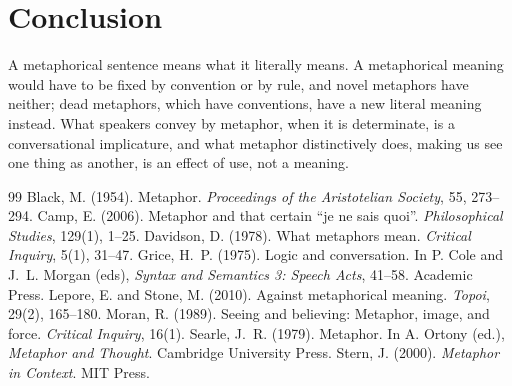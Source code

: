 \documentclass{situationist-preprint}
\begin{document}
\section{Conclusion}

A metaphorical sentence means what it literally means. A metaphorical meaning would have to be fixed by convention or by rule, and novel metaphors have neither; dead metaphors, which have conventions, have a new literal meaning instead. What speakers convey by metaphor, when it is determinate, is a conversational implicature, and what metaphor distinctively does, making us see one thing as another, is an effect of use, not a meaning.

\begin{thebibliography}{99}\small
{} Black, M. (1954). Metaphor. \emph{Proceedings of the Aristotelian Society}, 55, 273--294.
 Camp, E. (2006). Metaphor and that certain \enquote{je ne sais quoi}. \emph{Philosophical Studies}, 129(1), 1--25.
 Davidson, D. (1978). What metaphors mean. \emph{Critical Inquiry}, 5(1), 31--47.
 Grice, H.~P. (1975). Logic and conversation. In P. Cole and J.~L. Morgan (eds), \emph{Syntax and Semantics 3: Speech Acts}, 41--58. Academic Press.
 Lepore, E. and Stone, M. (2010). Against metaphorical meaning. \emph{Topoi}, 29(2), 165--180.
 Moran, R. (1989). Seeing and believing: Metaphor, image, and force. \emph{Critical Inquiry}, 16(1).
 Searle, J.~R. (1979). Metaphor. In A. Ortony (ed.), \emph{Metaphor and Thought}. Cambridge University Press.
 Stern, J. (2000). \emph{Metaphor in Context}. MIT Press.
\end{thebibliography}
\end{document}
